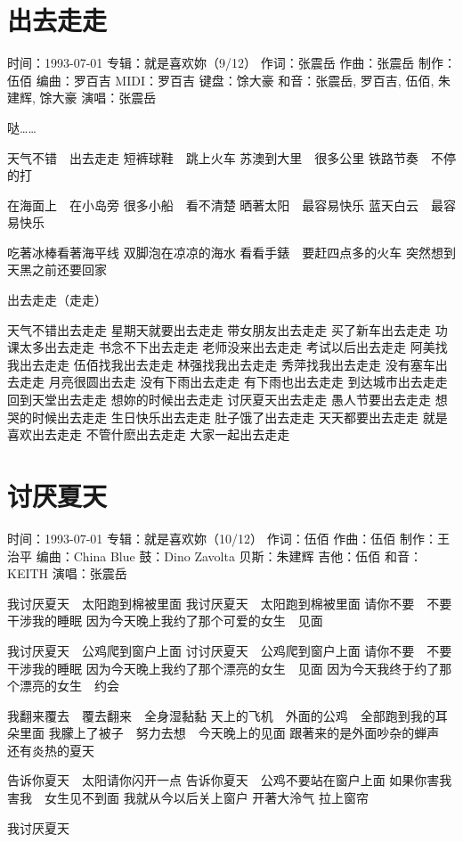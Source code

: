 \documentclass[UTF8,a4paper,oneside,twocolumn,12pt]{ctexbook}
\newcommand{\infopair}[2]{\textbullet #1：#2}
\newcommand{\zc}[1][伍佰]{\infopair{作词}{#1}}
\newcommand{\zq}[1][伍佰]{\infopair{作曲}{#1}}
\newcommand{\bq}[1][伍佰]{\infopair{编曲}{#1}}
\newcommand{\zj}[1]{\infopair{专辑}{#1}}
\newcommand{\zz}[1]{\infopair{制作}{#1}}
\newcommand{\sj}[1]{\infopair{时间}{#1}}
\newenvironment{info}{\begin{flushleft}\kaishu
	}
	{\end{flushleft}\normalsize\yahei\par}
\newenvironment{lyric}{
	}
{}
\begin{document}
\section{出去走走}
\begin{info}
	\sj{1993-07-01}
	\zj{就是喜欢妳（9/12）}
	\zc[张震岳]
	\zq[张震岳]
	\zz{伍佰}
	\bq[罗百吉]
	\infopair{MIDI}{罗百吉}
	\infopair{键盘}{馀大豪}
	\infopair{和音}{张震岳, 罗百吉, 伍佰, 朱建辉, 馀大豪}
	\infopair{演唱}{张震岳}
\end{info}
\begin{lyric}
	哒……

	天气不错　出去走走
	短裤球鞋　跳上火车
	苏澳到大里　很多公里
	铁路节奏　不停的打

	在海面上　在小岛旁
	很多小船　看不清楚
	晒著太阳　最容易快乐
	蓝天白云　最容易快乐

	吃著冰棒看著海平线
	双脚泡在凉凉的海水
	看看手錶　要赶四点多的火车
	突然想到天黑之前还要回家

	出去走走（走走）

	天气不错出去走走 星期天就要出去走走
	带女朋友出去走走 买了新车出去走走
	功课太多出去走走 书念不下出去走走
	老师没来出去走走 考试以后出去走走
	阿美找我出去走走 伍佰找我出去走走
	林强找我出去走走 秀萍找我出去走走
	没有塞车出去走走 月亮很圆出去走
	没有下雨出去走走 有下雨也出去走走
	到达城市出去走走 回到天堂出去走走
	想妳的时候出去走走 讨厌夏天出去走走
	愚人节要出去走走 想哭的时候出去走走
	生日快乐出去走走 肚子饿了出去走走
	天天都要出去走走 就是喜欢出去走走
	不管什麽出去走走 大家一起出去走走
\end{lyric}

\section{讨厌夏天}
\begin{info}
	\sj{1993-07-01}
	\zj{就是喜欢妳（10/12）}
	\zc
	\zq
	\zz{王治平}
	\bq[China Blue]
	\infopair{鼓}{Dino Zavolta}
	\infopair{贝斯}{朱建辉}
	\infopair{吉他}{伍佰}
	\infopair{和音}{KEITH}
	\infopair{演唱}{张震岳}
\end{info}
\begin{lyric}
	我讨厌夏天　太阳跑到棉被里面
	我讨厌夏天　太阳跑到棉被里面
	请你不要　不要　干涉我的睡眠
	因为今天晚上我约了那个可爱的女生　见面

	我讨厌夏天　公鸡爬到窗户上面
	讨讨厌夏天　公鸡爬到窗户上面
	请你不要　不要　干涉我的睡眠
	因为今天晚上我约了那个漂亮的女生　见面
	因为今天我终于约了那个漂亮的女生　约会

	我翻来覆去　覆去翻来　全身湿黏黏
	天上的飞机　外面的公鸡　全部跑到我的耳朵里面
	我朦上了被子　努力去想　今天晚上的见面
	跟著来的是外面吵杂的蝉声　还有炎热的夏天

	告诉你夏天　太阳请你闪开一点
	告诉你夏天　公鸡不要站在窗户上面
	如果你害我　害我　女生见不到面
	我就从今以后关上窗户
	开著大泠气
	拉上窗帘

	我讨厌夏天
\end{lyric}
\end{document}
